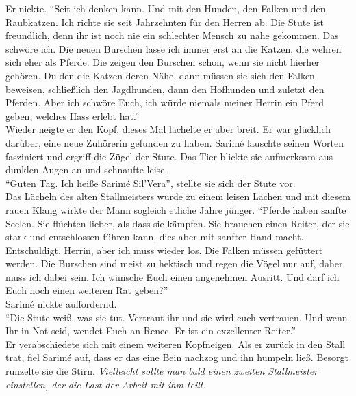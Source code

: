 Er nickte. ``Seit ich denken kann. Und mit den Hunden, den Falken und den Raubkatzen. Ich richte 
sie seit Jahrzehnten für den Herren ab. Die Stute ist freundlich, denn ihr ist noch nie ein 
schlechter Mensch zu nahe gekommen. Das schwöre ich. Die neuen Burschen lasse ich immer erst an die 
Katzen, die wehren sich eher als Pferde. Die zeigen den Burschen schon, wenn sie nicht hierher 
gehören. Dulden die Katzen deren Nähe, dann müssen sie sich den Falken beweisen, schließlich den 
Jagdhunden, dann den Hofhunden und zuletzt den Pferden. Aber ich schwöre Euch, ich würde niemals 
meiner Herrin ein Pferd geben, welches Hass erlebt hat.''\\
Wieder neigte er den Kopf, dieses Mal lächelte er aber breit. Er war glücklich darüber, eine neue 
Zuhörerin gefunden zu haben. Sarimé lauschte seinen Worten fasziniert und ergriff die Zügel der 
Stute. Das Tier blickte sie aufmerksam aus dunklen Augen an und schnaufte leise. \\
``Guten Tag. Ich heiße Sarimé Sil'Vera'', stellte sie sich der Stute vor. \\
Das Lächeln des alten Stallmeisters wurde zu einem leisen Lachen und mit diesem rauen Klang wirkte 
der Mann sogleich etliche Jahre jünger. ``Pferde haben sanfte Seelen. Sie flüchten lieber, als 
dass sie kämpfen. Sie brauchen einen Reiter, der sie stark und entschlossen führen kann, dies aber 
mit sanfter Hand macht. Entschuldigt, Herrin, aber ich muss wieder los. Die Falken müssen gefüttert 
werden. Die Burschen sind meist zu hektisch und regen die Vögel nur auf, daher muss ich dabei sein. 
Ich wünsche Euch einen angenehmen Ausritt. Und darf ich Euch noch einen weiteren Rat geben?''\\
Sarimé nickte auffordernd.\\
``Die Stute weiß, was sie tut. Vertraut ihr und sie wird euch vertrauen. Und wenn Ihr in Not seid, 
wendet Euch an Renec. Er ist ein exzellenter Reiter.''\\
Er verabschiedete sich mit einem weiteren Kopfneigen. Als er zurück in den Stall trat, fiel Sarimé 
auf, dass er das eine Bein nachzog und ihn humpeln ließ. Besorgt runzelte sie die Stirn. 
\textit{Vielleicht sollte man bald einen zweiten Stallmeister einstellen, der die Last der Arbeit 
mit ihm teilt.}\\

